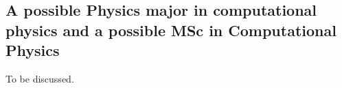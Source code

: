\documentclass[%
oneside,                 %
final,                   %
10pt]{article}
\begin{document}
\noindent
\subsection{A possible Physics major in computational physics and a possible MSc in Computational Physics}

To be discussed. 


\end{document}
